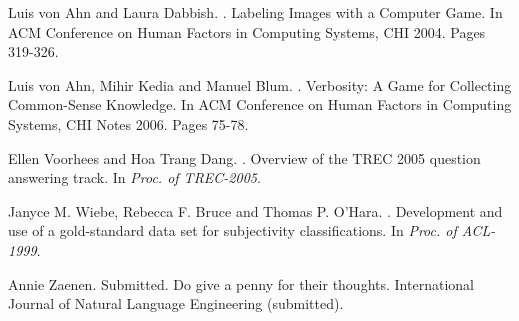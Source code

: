 \documentclass[11pt]{article}
\begin{document}
\begin{thebibliography}{}
Luis von Ahn and Laura Dabbish.
.
\newblock Labeling Images with a Computer Game.
\newblock In ACM Conference on Human Factors in Computing Systems, CHI 2004. Pages 319-326. 

Luis von Ahn, Mihir Kedia and Manuel Blum. 
.
\newblock Verbosity: A Game for Collecting Common-Sense Knowledge. 
\newblock In ACM Conference on Human Factors in Computing Systems, CHI Notes 2006. Pages 75-78. 

Ellen Voorhees and Hoa Trang Dang.
.
\newblock Overview of the TREC 2005 question answering track.
\newblock In \textit{ Proc. of TREC-2005}.

Janyce M. Wiebe, Rebecca F. Bruce and Thomas P. O'Hara.
.
\newblock Development and use of a gold-standard data set for subjectivity classifications.
\newblock In \textit{Proc. of ACL-1999}.

Annie Zaenen. 
\newblock Submitted.  %
\newblock Do give a penny for their thoughts.
\newblock International Journal of Natural Language Engineering (submitted).

\end{thebibliography}
\end{document}
